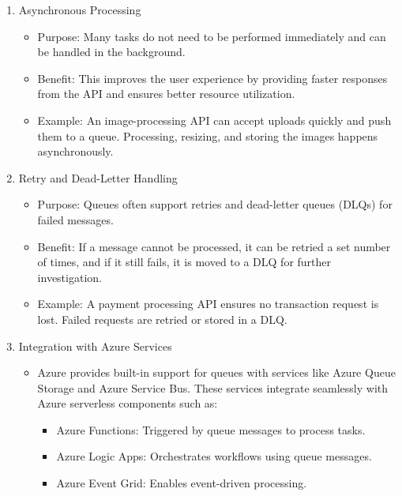 \documentclass[a4paper,11pt]{article}
\begin{document}
\begin{enumerate}
	\begin{itemize}
		\item Purpose: Queues help control the rate at which messages are processed by downstream services, preventing overload.
		\item Benefit: This protects the system from performance degradation or failures due to resource exhaustion.
		\item Example: The API can accept thousands of requests per second, but the backend may process only a hundred at a time. The queue enforces this limit.
	\end{itemize}
	\item Asynchronous Processing
	\begin{itemize}
		\item Purpose: Many tasks do not need to be performed immediately and can be handled in the background.
		\item Benefit: This improves the user experience by providing faster responses from the API and ensures better resource utilization.
		\item Example: An image-processing API can accept uploads quickly and push them to a queue. Processing, resizing, and storing the images happens asynchronously.
	\end{itemize}
	\item Retry and Dead-Letter Handling
	\begin{itemize}
		\item Purpose: Queues often support retries and dead-letter queues (DLQs) for failed messages.
		\item Benefit: If a message cannot be processed, it can be retried a set number of times, and if it still fails, it is moved to a DLQ for further investigation.
		\item Example: A payment processing API ensures no transaction request is lost. Failed requests are retried or stored in a DLQ.
	\end{itemize}
	\item Integration with Azure Services
	\begin{itemize}
		\item Azure provides built-in support for queues with services like Azure Queue Storage and Azure Service Bus. These services integrate seamlessly with Azure serverless components such as:
		\begin{itemize}
			\item Azure Functions: Triggered by queue messages to process tasks.
			\item Azure Logic Apps: Orchestrates workflows using queue messages.
			\item Azure Event Grid: Enables event-driven processing.
		\end{itemize}
	\end{itemize}
	

\end{enumerate}
\end{document}
